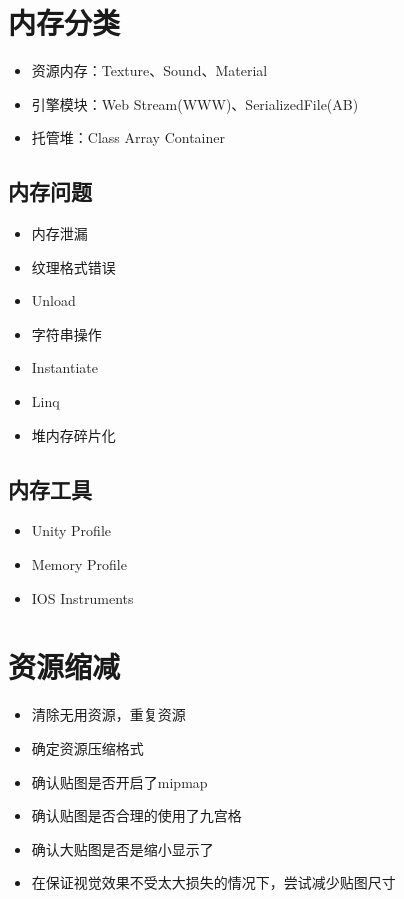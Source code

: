 \documentclass[UTF8,a4paper,12pt]{ctexbook}
\begin{document}
	\section{内存分类}
		\begin{itemize}
			\item 资源内存：Texture、Sound、Material
			\item 引擎模块：Web Stream(WWW)、SerializedFile(AB)
			\item 托管堆：Class Array Container
		\end{itemize}
		
		\subsection{内存问题}
			\begin{itemize}
				\item 内存泄漏
				\item 纹理格式错误
				\item Unload
				\item 字符串操作
				\item Instantiate
				\item Linq
				\item 堆内存碎片化
			\end{itemize}
		
		\subsection{内存工具}
			\begin{itemize}
				\item Unity Profile
				\item Memory Profile
				\item IOS Instruments
			\end{itemize}	
		
		
	\section{资源缩减}
		\begin{itemize}
			\item 清除无用资源，重复资源
			\item 确定资源压缩格式
			\item 确认贴图是否开启了mipmap
			\item 确认贴图是否合理的使用了九宫格
			\item 确认大贴图是否是缩小显示了
			\item 在保证视觉效果不受太大损失的情况下，尝试减少贴图尺寸
		\end{itemize}	
		
\end{document}

